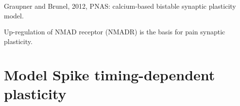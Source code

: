 % 
% 
% 
% 
%   
% 
% 
% 
% 

Graupner and Brunel, 2012, PNAS: calcium-based bistable synaptic plasticity
model.


Up-regulation of NMAD receptor (NMADR) is the basis for pain synaptic
plasticity.


\section{Model Spike timing-dependent plasticity}
\label{sec:spike-timing-dependent-plasticity_model}

